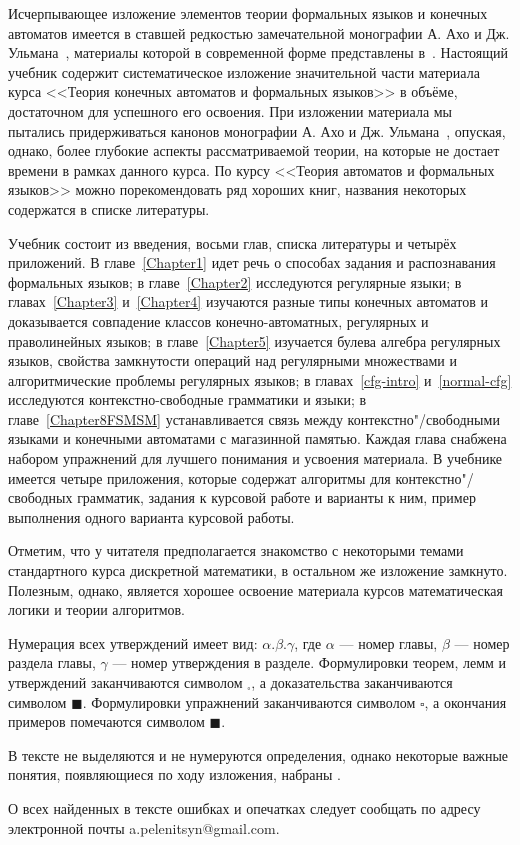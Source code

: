Исчерпывающее изложение элементов теории формальных языков и конечных автоматов имеется в ставшей редкостью замечательной монографии А. Ахо и Дж. Ульмана~\cite{AU}, материалы которой в современной форме представлены в~\cite{Hop}. Настоящий учебник содержит систематическое изложение значительной части материала курса <<Теория конечных автоматов и формальных языков>> в объёме, достаточном для успешного его освоения. При изложении материала мы пытались придерживаться канонов монографии А. Ахо и Дж. Ульмана~\cite{AU}, опуская, однако, более глубокие аспекты рассматриваемой теории, на которые не достает времени в рамках данного курса. По курсу <<Теория автоматов и формальных языков>> можно порекомендовать ряд хороших книг, названия некоторых содержатся в списке литературы. 

Учебник состоит из введения, восьми глав, списка литературы и четырёх приложений. В главе~\ref{Chapter1} идет речь о способах задания и распознавания формальных языков; в главе~\ref{Chapter2} исследуются регулярные языки; в главах~\ref{Chapter3} и~\ref{Chapter4} изучаются разные типы конечных автоматов и доказывается совпадение классов конечно-автоматных, регулярных и праволинейных языков; в главе~\ref{Chapter5} изучается булева алгебра регулярных языков, свойства замкнутости операций над регулярными множествами и алгоритмические проблемы регулярных языков; в главах~\ref{cfg-intro} и~\ref{normal-cfg} исследуются контекстно-свободные грамматики и языки; в главе~\ref{Chapter8FSMSM} устанавливается связь между контекстно"/свободными языками и конечными автоматами с магазинной памятью. Каждая глава снабжена набором упражнений для лучшего понимания и усвоения материала. В учебнике имеется четыре приложения, которые содержат алгоритмы для контекстно"/свободных грамматик, задания к курсовой работе и варианты к ним, пример выполнения одного варианта курсовой работы.

Отметим, что у читателя предполагается знакомство с некоторыми темами стандартного курса дискретной математики, в остальном же изложение замкнуто. Полезным, однако, является хорошее освоение материала курсов математическая логики и теории алгоритмов.

Нумерация всех утверждений имеет вид: $\alpha.\beta.\gamma$, где $\alpha$ --- номер главы, $\beta$ --- номер раздела главы, $\gamma$ --- номер утверждения в разделе. Формулировки теорем, лемм и утверждений заканчиваются символом $_\square$, а доказательства заканчиваются символом $\blacksquare$. Формулировки упражнений заканчиваются символом $\square$, а окончания примеров помечаются символом $\blacksquare$.

В тексте не выделяются и не нумеруются определения, однако некоторые важные понятия, появляющиеся по ходу изложения, набраны .

О всех найденных в тексте ошибках и опечатках следует сообщать по адресу электронной почты a.pelenitsyn@gmail.com.

